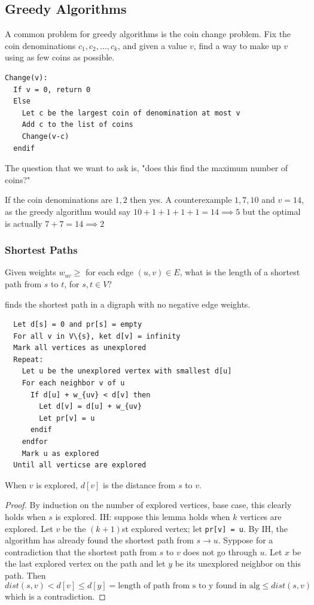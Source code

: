 \documentclass[12pt]{scrartcl}
\begin{document}
\subsection{Greedy Algorithms}

A common problem for greedy algorithms is the coin change problem. Fix the coin denominations
$c_1, c_2, \ldots, c_k$, and given a value $v$, find a way to make up $v$ using as few coins as possible. 
\begin{lstlisting}
Change(v):
  If v = 0, return 0
  Else
    Let c be the largest coin of denomination at most v
    Add c to the list of coins
    Change(v-c)
  endif
\end{lstlisting}
The question that we want to ask is, "does this find the maximum number of coins?"

\begin{note}
  If the coin denominations are $1, 2$ then yes. A counterexample $1, 7, 10$ and $v = 14$, as the 
  greedy algorithm would say $10 + 1 + 1 + 1 + 1 = 14 \implies 5$ but the optimal is actually 
  $7 + 7 = 14 \implies 2$
\end{note}

\subsubsection{Shortest Paths}

Given weights $w_{uv} \geq $ for each edge $(u, v) \in E$, what is the length of a shortest path from 
$s$ to $t$, for $s, t \in V$?

\begin{definition}
   finds the shortest path in a digraph with no negative edge weights. 
\begin{lstlisting}
  Let d[s] = 0 and pr[s] = empty
  For all v in V\{s}, ket d[v] = infinity
  Mark all vertices as unexplored
  Repeat:
    Let u be the unexplored vertex with smallest d[u]
    For each neighbor v of u
      If d[u] + w_{uv} < d[v] then 
        Let d[v] = d[u] + w_{uv}
        Let pr[v] = u
      endif
    endfor
    Mark u as explored
  Until all verticse are explored
\end{lstlisting}
\end{definition}

\begin{lemma}
  When $v$ is explored, $d[v]$ is the distance from $s$ to $v$. 
  \begin{proof}
    By induction on the number of explored vertices, base case, this clearly holds when $s$ is explored. 
    IH: suppose this lemma holds when $k$ vertices are explored. Let $v$ be the $(k+1)$st explored vertex; let 
    \verb|pr[v] = u|. By IH, the algorithm has already found the shortest path from $s \to u$. 
    Syppose for a contradiction that the shortest path from $s$ to $v$ does not go through $u$. Let 
    $x$ be the last explored vertex on the path and let $y$ be its unexplored neighbor on this path. Then 
    \[dist(s, v) < d[v] \leq d[y] = \text{length of path from s to y found in alg} \leq dist(s, v)\]
    which is a contradiction.  
  \end{proof}
\end{lemma}
\end{document}
